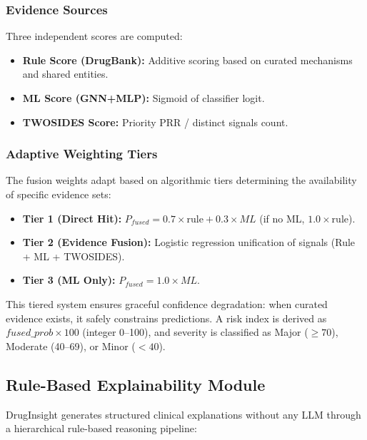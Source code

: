 \documentclass[conference]{IEEEtran}
\begin{document}
\subsubsection{Evidence Sources}
Three independent scores are computed:

\begin{itemize}
    \item \textbf{Rule Score (DrugBank):} Additive scoring based on curated mechanisms and shared entities.
    \item \textbf{ML Score (GNN+MLP):} Sigmoid of classifier logit.
    \item \textbf{TWOSIDES Score:} Priority PRR / distinct signals count.
\end{itemize}

\subsubsection{Adaptive Weighting Tiers}
The fusion weights adapt based on algorithmic tiers determining the availability of specific evidence sets:

\begin{itemize}
    \item \textbf{Tier 1 (Direct Hit):} $P_{fused} = 0.7 \times \text{rule} + 0.3 \times ML$ (if no ML, $1.0 \times \text{rule}$).
    \item \textbf{Tier 2 (Evidence Fusion):} Logistic regression unification of signals (Rule + ML + TWOSIDES).
    \item \textbf{Tier 3 (ML Only):} $P_{fused} = 1.0 \times ML$.
\end{itemize}

This tiered system ensures graceful confidence degradation: when curated evidence exists, it safely constrains predictions. A risk index is derived as $fused\_prob \times 100$ (integer 0--100), and severity is classified as Major ($\geq 70$), Moderate (40--69), or Minor ($< 40$).

\subsection{Rule-Based Explainability Module}
DrugInsight generates structured clinical explanations without any LLM through a hierarchical rule-based reasoning pipeline:
\end{document}
